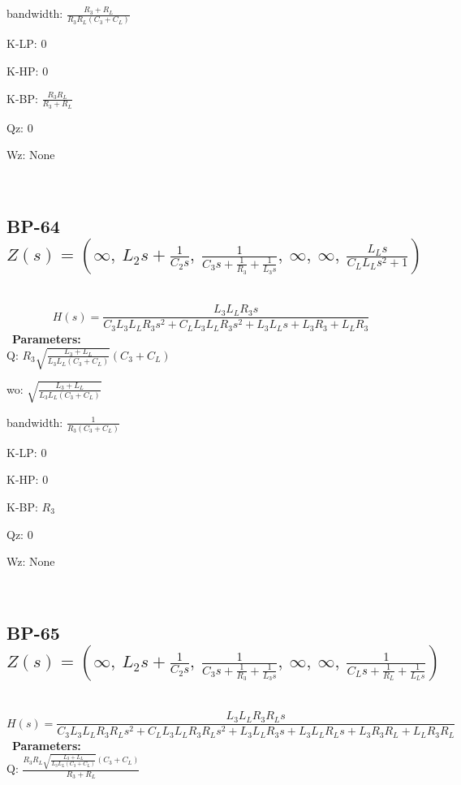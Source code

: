\documentclass{article}
\begin{document}
bandwidth: $\frac{R_{3} + R_{L}}{R_{3} R_{L} \left(C_{3} + C_{L}\right)}$\ 

K-LP: $0$\ 

K-HP: $0$\ 

K-BP: $\frac{R_{3} R_{L}}{R_{3} + R_{L}}$\ 

Qz: $0$\ 

Wz: $\text{None}$\ 

\ 

\subsection{BP-64 $Z(s) = \left( \infty, \  L_{2} s + \frac{1}{C_{2} s}, \  \frac{1}{C_{3} s + \frac{1}{R_{3}} + \frac{1}{L_{3} s}}, \  \infty, \  \infty, \  \frac{L_{L} s}{C_{L} L_{L} s^{2} + 1}\right)$ } \ 
\textbf{\[H(s) = \frac{L_{3} L_{L} R_{3} s}{C_{3} L_{3} L_{L} R_{3} s^{2} + C_{L} L_{3} L_{L} R_{3} s^{2} + L_{3} L_{L} s + L_{3} R_{3} + L_{L} R_{3}}\] } \ 
\textbf{Parameters:}\\ 

Q: $R_{3} \sqrt{\frac{L_{3} + L_{L}}{L_{3} L_{L} \left(C_{3} + C_{L}\right)}} \left(C_{3} + C_{L}\right)$\ 

wo: $\sqrt{\frac{L_{3} + L_{L}}{L_{3} L_{L} \left(C_{3} + C_{L}\right)}}$\ 

bandwidth: $\frac{1}{R_{3} \left(C_{3} + C_{L}\right)}$\ 

K-LP: $0$\ 

K-HP: $0$\ 

K-BP: $R_{3}$\ 

Qz: $0$\ 

Wz: $\text{None}$\ 

\ 

\subsection{BP-65 $Z(s) = \left( \infty, \  L_{2} s + \frac{1}{C_{2} s}, \  \frac{1}{C_{3} s + \frac{1}{R_{3}} + \frac{1}{L_{3} s}}, \  \infty, \  \infty, \  \frac{1}{C_{L} s + \frac{1}{R_{L}} + \frac{1}{L_{L} s}}\right)$ } \ 
\textbf{\[H(s) = \frac{L_{3} L_{L} R_{3} R_{L} s}{C_{3} L_{3} L_{L} R_{3} R_{L} s^{2} + C_{L} L_{3} L_{L} R_{3} R_{L} s^{2} + L_{3} L_{L} R_{3} s + L_{3} L_{L} R_{L} s + L_{3} R_{3} R_{L} + L_{L} R_{3} R_{L}}\] } \ 
\textbf{Parameters:}\\ 

Q: $\frac{R_{3} R_{L} \sqrt{\frac{L_{3} + L_{L}}{L_{3} L_{L} \left(C_{3} + C_{L}\right)}} \left(C_{3} + C_{L}\right)}{R_{3} + R_{L}}$\ 
\end{document}
